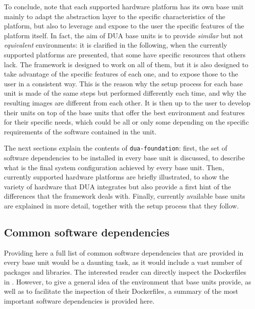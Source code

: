 To conclude, note that each supported hardware platform has its own base unit mainly to adapt the abstraction layer to the specific characteristics of the platform, but also to leverage and expose to the user the specific features of the platform itself. In fact, the aim of DUA base units is to provide \emph{similar} but not \emph{equivalent} environments: it is clarified in the following, when the currently supported platforms are presented, that some have specific resources that others lack. The framework is designed to work on all of them, but it is also designed to take advantage of the specific features of each one, and to expose those to the user in a consistent way. This is the reason why the setup process for each base unit is made of the same steps but performed differently each time, and why the resulting images are different from each other. It is then up to the user to develop their units on top of the base units that offer the best environment and features for their specific needs, which could be all or only some depending on the specific requirements of the software contained in the unit.

The next sections explain the contents of \texttt{dua-foundation}: first, the set of software dependencies to be installed in every base unit is discussed, to describe what is the final system configuration achieved by every base unit. Then, currently supported hardware platforms are briefly illustrated, to show the variety of hardware that DUA integrates but also provide a first hint of the differences that the framework deals with. Finally, currently available base units are explained in more detail, together with the setup process that they follow.

\subsection{Common software dependencies}
\label{sec:dua_common_dependencies}
Providing here a full list of common software dependencies that are provided in every base unit would be a daunting task, as it would include a vast number of packages and libraries. The interested reader can directly inspect the Dockerfiles in \cite{masocco_dua-foundation_nodate}. However, to give a general idea of the environment that base units provide, as well as to facilitate the inspection of their Dockerfiles, a summary of the most important software dependencies is provided here.

